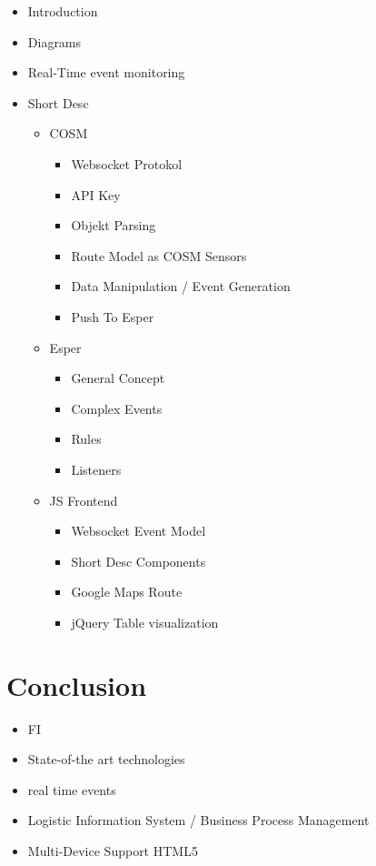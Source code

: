 \documentclass{acm_proc_article-sp}
\begin{document}
\begin{itemize}
	\item Introduction
	\item Diagrams
	\item Real-Time event monitoring
	\item Short Desc
	\begin{itemize}
		\item COSM
		\begin{itemize}
			\item Websocket Protokol
			\item API Key
			\item Objekt Parsing
			\item Route Model as COSM Sensors
			\item Data Manipulation / Event Generation
			\item Push To Esper
		\end{itemize}
		\item Esper
		\begin{itemize}
			\item General Concept
			\item Complex Events
			\item Rules
			\item Listeners
		\end{itemize}
		\item JS Frontend
		\begin{itemize}
			\item Websocket Event Model
			\item Short Desc Components
			\item Google Maps Route
			\item jQuery Table visualization
		\end{itemize}
	\end{itemize}
\end{itemize}


\section{Conclusion}
\label{sec:Conclusion}
\begin{itemize}
	\item FI
	\item State-of-the art technologies
	\item real time events
	\item Logistic Information System / Business Process Management
	\item Multi-Device Support HTML5
\end{itemize}

%

%
%
\appendix
\end{document}
